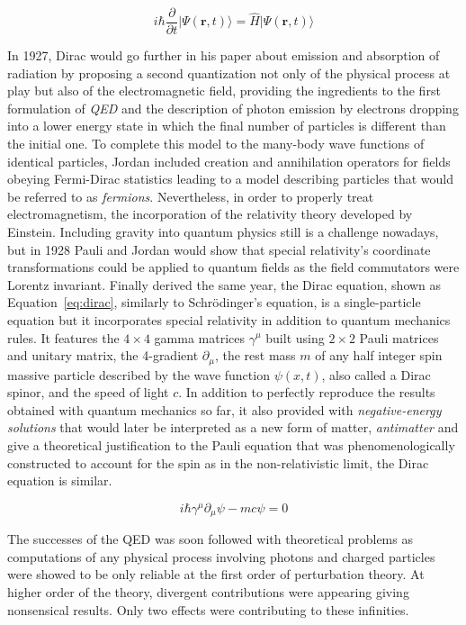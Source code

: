 	\begin{equation}
		\label{eq:schrodinger}
		i\hbar \frac{\partial}{\partial t} \vert \Psi(\mathbf{r},t)\rangle  = \hat{H} \vert \Psi(\mathbf{r},t)\rangle
	\end{equation}
	
	In 1927, Dirac would go further in his paper about emission and absorption of radiation by proposing a second quantization not only of the physical process at play but also of the electromagnetic field, providing the ingredients to the first formulation of \textit{\acf{QED}} and the description of photon emission by electrons dropping into a lower energy state in which the final number of particles is different than the initial one. To complete this model to the many-body wave functions of identical particles, Jordan included creation and annihilation operators for fields obeying Fermi-Dirac statistics leading to a model describing particles that would be referred to as \textit{fermions}. Nevertheless, in order to properly treat electromagnetism, the incorporation of the relativity theory developed by Einstein. Including gravity into quantum physics still is a challenge nowadays, but in 1928 Pauli and Jordan would show that special relativity's coordinate transformations could be applied to quantum fields as the field commutators were Lorentz invariant. Finally derived the same year, the Dirac equation, shown as Equation~\ref{eq:dirac}, similarly to Schrödinger's equation, is a single-particle equation but it incorporates special relativity in addition to quantum mechanics rules. It features the $4 \times 4$ gamma matrices $\gamma^\mu$ built using $2 \times 2$ Pauli matrices and unitary matrix, the 4-gradient $\partial_\mu$, the rest mass $m$ of any half integer spin massive particle described by the wave function $\psi(x,t)$, also called a Dirac spinor, and the speed of light $c$. In addition to perfectly reproduce the results obtained with quantum mechanics so far, it also provided with \textit{negative-energy solutions} that would later be interpreted as a new form of matter, \textit{antimatter} and give a theoretical justification to the Pauli equation that was phenomenologically constructed to account for the spin as in the non-relativistic limit, the Dirac equation is similar.
	
	\begin{equation}
		\label{eq:dirac}
		i\hbar \gamma^\mu\partial_\mu\psi - mc\psi = 0
	\end{equation}
	
	The successes of the QED was soon followed with theoretical problems as computations of any physical process involving photons and charged particles were showed to be only reliable at the first order of perturbation theory. At higher order of the theory, divergent contributions were appearing giving nonsensical results. Only two effects were contributing to these infinities.
	
